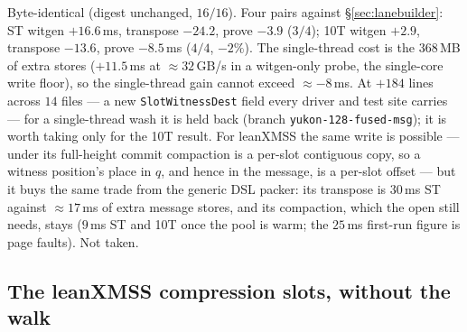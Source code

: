 \documentclass[11pt]{article}
\newcommand{\code}[1]{\texttt{#1}}
\begin{document}
\begin{itemize}
Byte-identical (digest unchanged, $16/16$). Four pairs against
\S\ref{sec:lanebuilder}: ST witgen $+16.6\,$ms, transpose $-24.2$, prove
$-3.9$ ($3/4$); 10T witgen $+2.9$, transpose $-13.6$, prove
$-8.5\,$ms ($4/4$, $-2\%$). The single-thread cost is the $368\,$MB of
extra stores ($+11.5\,$ms at $\approx32\,$GB/s in a witgen-only probe, the
single-core write floor), so the single-thread gain cannot exceed
$\approx-8\,$ms. At $+184$ lines across $14$ files --- a new
\code{SlotWitnessDest} field every driver and test site carries --- for a
single-thread wash it is held back (branch \code{yukon-128-fused-msg});
it is worth taking only for the 10T result. For leanXMSS the same
write is possible --- under its full-height commit compaction is a
per-slot contiguous copy, so a witness position's place in $q$, and
hence in the message, is a per-slot offset --- but it buys the same
trade from the generic DSL packer: its transpose is $30\,$ms ST against
$\approx17\,$ms of extra message stores, and its compaction, which the
open still needs, stays ($9\,$ms ST and 10T once the pool is warm;
the $25\,$ms first-run figure is page faults). Not taken.
\end{itemize}

\subsection{The leanXMSS compression slots, without the walk}\label{sec:compresspacker}
\end{document}
